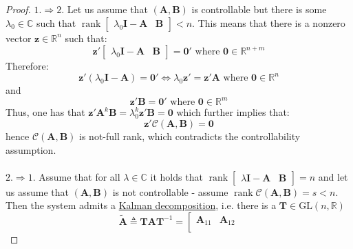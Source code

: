 \documentclass[a4paper,10pt,oneside]{book}
\begin{document}
\begin{proof}
 $1.\Rightarrow 2.$ Let us assume that $(\mathbf{A},\mathbf{B})$ is controllable but there is some $\lambda_0 \in \mathbb{C}$ such that $\operatorname{rank} \left[ {\begin{array}{c|c} \lambda_0\mathbf{I}-\mathbf{A} & \mathbf{B} \end{array} } \right]<n$. This means that there is a nonzero vector $\mathbf{z}\in \mathbb{R}^{n}$ such that:
 \begin{equation}
  \mathbf{z}'\left[ {\begin{array}{c|c} \lambda_0\mathbf{I}-\mathbf{A} & \mathbf{B} \end{array} } \right]=\mathbf{0}' \text { where } \mathbf{0}\in \mathbb{R}^{n+m}
 \end{equation}
 Therefore:
 \begin{equation}
  \mathbf{z}'(\lambda_0\mathbf{I}-\mathbf{A}) =\mathbf{0}'\Leftrightarrow
 \lambda_0\mathbf{z}'=\mathbf{z}'\mathbf{A} \text { where } \mathbf{0}\in \mathbb{R}^{n}
 \end{equation}
 and
 \begin{equation}
  \mathbf{z}'\mathbf{B} =\mathbf{0}' \text { where } \mathbf{0}\in \mathbb{R}^{m}
 \end{equation}
 Thus, one has that $\mathbf{z}'\mathbf{A}^{k}\mathbf{B}=\lambda_0^k \mathbf{z}'\mathbf{B}=\mathbf{0}$ which further implies that:
 \begin{equation}
  \mathbf{z}'\mathcal{C}(\mathbf{A},\mathbf{B})=\mathbf{0}
 \end{equation}
 hence $\mathcal{C}(\mathbf{A},\mathbf{B})$ is not-full rank, which contradicts the controllability assumption.\\
\\
$2. \Rightarrow 1.$ Assume that for all $\lambda\in\mathbb{C}$ it holds that $\operatorname{rank} \left[ {\begin{array}{cc} \lambda\mathbf{I}-\mathbf{A} & \mathbf{B} \end{array} } \right]=n$ and let us assume that $(\mathbf{A},\mathbf{B})$ is not controllable - assume $\operatorname{rank}\mathcal{C}(\mathbf{A},\mathbf{B})=s<n$. Then the system admits a \hyperlink{prop:InputDecoupling}{Kalman decomposition}, i.e. there is a $\mathbf{T}\in\text{GL}(n,\mathbb{R})$
\begin{equation}
 \tilde{\mathbf{A}}\triangleq\mathbf{TAT}^{-1}=\left[ {\begin{array}{cc}
      \mathbf{A}_{11} & \mathbf{A}_{12} \\ 

\end{array}}
\end{equation}
\end{proof}
\end{document}
